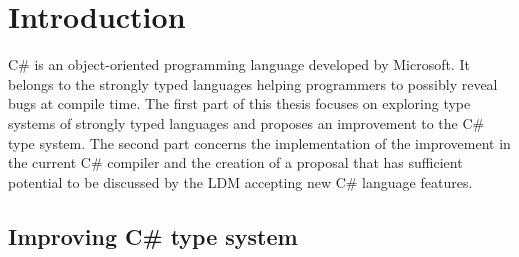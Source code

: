 \chapter{Introduction}

C\# is an object-oriented programming language developed by Microsoft. 
It belongs to the strongly typed languages helping programmers to possibly reveal bugs at compile time. 
The first part of this thesis focuses on exploring type systems of strongly typed languages and proposes an improvement to the C\# type system. 
The second part concerns the implementation of the improvement in the current C\# compiler and the creation of a proposal that has sufficient potential to be discussed by the \ac{LDM} accepting new C\# language features.

\section{Improving C\# type system}

